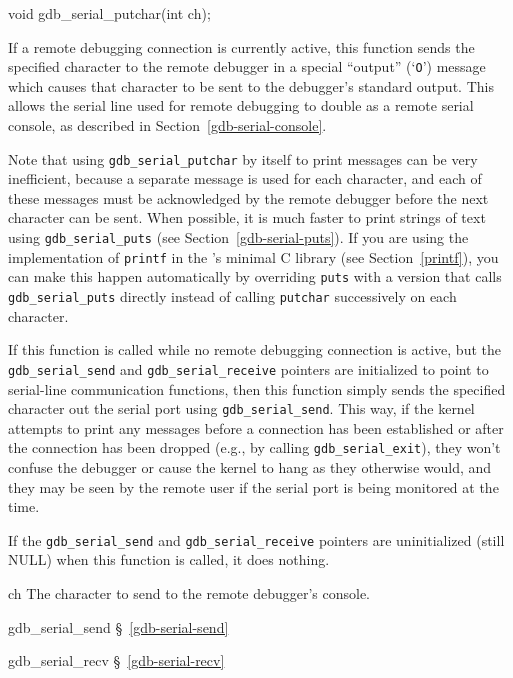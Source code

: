 \label{gdb-serial-putchar}
\begin{apisyn}

	\funcproto void gdb_serial_putchar(int ch);
\end{apisyn}
\begin{apidesc}
	If a remote debugging connection is currently active,
	this function sends the specified character to the remote debugger
	in a special ``output'' (`{\tt O}') message
	which causes that character
	to be sent to the debugger's standard output.
	This allows the serial line used for remote debugging
	to double as a remote serial console,
	as described in Section~\ref{gdb-serial-console}.

	Note that using {\tt gdb_serial_putchar} by itself to print messages
	can be very inefficient,
	because a separate message is used for each character,
	and each of these messages must be acknowledged by the remote debugger
	before the next character can be sent.
	When possible, it is much faster to print strings of text
	using {\tt gdb_serial_puts} (see Section~\ref{gdb-serial-puts}).
	If you are using the implementation of {\tt printf}
	in the \oskit{}'s minimal C library (see Section~\ref{printf}),
	you can make this happen automatically by overriding {\tt puts}
	with a version that calls {\tt gdb_serial_puts} directly
	instead of calling {\tt putchar} successively on each character.

	If this function is called
	while no remote debugging connection is active,
	but the {\tt gdb_serial_send} and {\tt gdb_serial_receive} pointers
	are initialized to point to serial-line communication functions,
	then this function simply sends the specified character
	out the serial port using {\tt gdb_serial_send}.
	This way, if the kernel attempts to print any messages
	before a connection has been established
	or after the connection has been dropped
	(e.g., by calling {\tt gdb_serial_exit}),
	they won't confuse the debugger or cause the kernel to hang
	as they otherwise would,
	and they may be seen by the remote user
	if the serial port is being monitored at the time.

	If the {\tt gdb_serial_send} and {\tt gdb_serial_receive} pointers
	are uninitialized (still NULL) when this function is called,
	it does nothing.
\end{apidesc}
\begin{apiparm}
	\item[ch]
		The character to send to the remote debugger's console.
\end{apiparm}
\begin{apidep}
	\item[gdb_serial_send]		\S~\ref{gdb-serial-send}
	\item[gdb_serial_recv]		\S~\ref{gdb-serial-recv}
\end{apidep}

